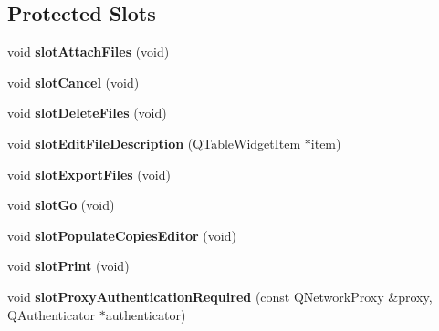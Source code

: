 \subsection*{Protected Slots}
\begin{DoxyCompactItemize}
\item 
void {\bfseries slot\+Attach\+Files} (void)\hypertarget{classbiblioteq__magazine_aac83be1223224e358440d5a5b928b263}{}\label{classbiblioteq__magazine_aac83be1223224e358440d5a5b928b263}

\item 
void {\bfseries slot\+Cancel} (void)\hypertarget{classbiblioteq__magazine_ac5808297f5976e5ef2883b90b04aaa03}{}\label{classbiblioteq__magazine_ac5808297f5976e5ef2883b90b04aaa03}

\item 
void {\bfseries slot\+Delete\+Files} (void)\hypertarget{classbiblioteq__magazine_accad672caf97ae20df3e9afb8aa8ae5a}{}\label{classbiblioteq__magazine_accad672caf97ae20df3e9afb8aa8ae5a}

\item 
void {\bfseries slot\+Edit\+File\+Description} (Q\+Table\+Widget\+Item $\ast$item)\hypertarget{classbiblioteq__magazine_a7d9634c005e3934a16f71812dd5f5439}{}\label{classbiblioteq__magazine_a7d9634c005e3934a16f71812dd5f5439}

\item 
void {\bfseries slot\+Export\+Files} (void)\hypertarget{classbiblioteq__magazine_a716eba32a5a26f2c5523d17f3edabfba}{}\label{classbiblioteq__magazine_a716eba32a5a26f2c5523d17f3edabfba}

\item 
void {\bfseries slot\+Go} (void)\hypertarget{classbiblioteq__magazine_a1faba8da2af2924afe2bdd726c27d530}{}\label{classbiblioteq__magazine_a1faba8da2af2924afe2bdd726c27d530}

\item 
void {\bfseries slot\+Populate\+Copies\+Editor} (void)\hypertarget{classbiblioteq__magazine_a14eb96b25a7f1369718bd2b97666beb1}{}\label{classbiblioteq__magazine_a14eb96b25a7f1369718bd2b97666beb1}

\item 
void {\bfseries slot\+Print} (void)\hypertarget{classbiblioteq__magazine_a9df9bd8bee01833709722ee547cc6006}{}\label{classbiblioteq__magazine_a9df9bd8bee01833709722ee547cc6006}

\item 
void {\bfseries slot\+Proxy\+Authentication\+Required} (const Q\+Network\+Proxy \&proxy, Q\+Authenticator $\ast$authenticator)\hypertarget{classbiblioteq__magazine_a255c2b2364d0f19a4fbe2434c7fee1e9}{}\label{classbiblioteq__magazine_a255c2b2364d0f19a4fbe2434c7fee1e9}


\end{DoxyCompactItemize}
